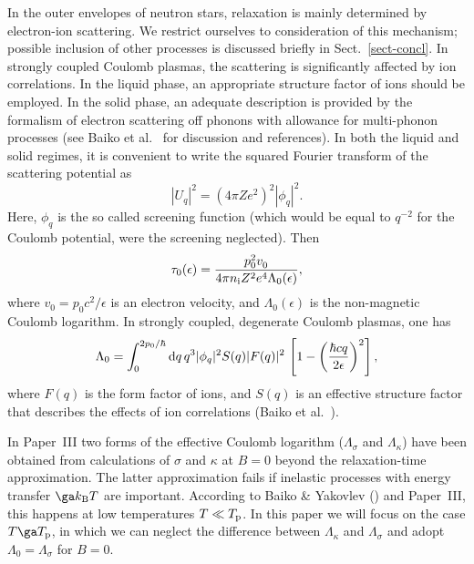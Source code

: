 \documentclass{aa}
\newcommand{\beq}{\begin{equation}}
\newcommand{\eeq}{\end{equation}}
\newcommand{\kB}{k_{\rm B}}
\begin{document}
In the outer envelopes of neutron stars,
relaxation is mainly determined by electron-ion scattering.
We restrict ourselves to consideration of this mechanism;
possible inclusion of other processes is discussed briefly
in Sect.~\ref{sect-concl}.
In strongly coupled Coulomb plasmas, the scattering is significantly
affected by ion correlations.
In the liquid phase, an appropriate structure factor of ions should
be employed.
In the solid phase, an adequate description is provided
by the formalism of electron scattering off phonons
with allowance for multi-phonon processes
(see Baiko et al.\ \cite{baiko-ea98} for discussion
and references).
In both the liquid and solid regimes, it is convenient
to write the squared Fourier transform of 
the scattering potential as
\beq
     |U_q|^2 =  (4\pi Ze^2)^2 |\phi_q|^2.
\label{Uq}
\eeq
Here, $\phi_q$ is the so called screening function (which
would be equal to $q^{-2}$ for the Coulomb
potential, were the screening neglected).
Then
\beq
   \tau_0(\epsilon) = {p_0^2 v_0^{\phantom{2}} \over
              4\pi n_{\rm i} Z^2 e^4 \Lambda_0(\epsilon)},
\label{tau0}
\eeq
where $v_0 = p_0 c^2/\epsilon$ is an electron velocity, and
$\Lambda_0(\epsilon)$ is the non-magnetic Coulomb logarithm.
In strongly coupled, degenerate Coulomb plasmas,
one has
\beq
    \Lambda_0 = \int_0^{2p_0/\hbar}
    {\rm d}q\,q^3 |\phi_q|^2 S(q) |F(q)|^2\,
    \left[1 -
    \left({\hbar c q\over2 \epsilon}\right)^2  \right],
\label{L}
\eeq
where
$F(q)$ is the form factor of ions,
and $S(q)$ is an effective structure factor that describes
the effects of ion correlations (Baiko et al.\ \cite{baiko-ea98}).

In Paper~III two forms of the effective Coulomb logarithm
($\Lambda_\sigma$ and $\Lambda_\kappa$)
have been obtained from calculations of $\sigma$ and $\kappa$ at $B=0$
beyond the relaxation-time approximation.
The latter approximation
fails if inelastic processes
with energy transfer $\ga \kB T$ are important.
According to Baiko \& Yakovlev (\cite{bya95}) and Paper~III,
this happens at low temperatures $T\ll T_{\rm p}$.
In this paper we will focus on the case
$T\ga T_{\rm p}$, in which
we can neglect the difference
between $\Lambda_\kappa$ and $\Lambda_\sigma$
and adopt $\Lambda_0=\Lambda_\sigma$ for $B=0$.
\end{document}

